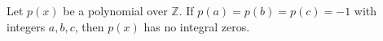 Let $p(x)$ be a polynomial over $\mathbb{Z}$. If $p(a) = p(b) = p(c) = -1$ with integers $a, b, c$, then $p(x)$ has no integral zeros.

